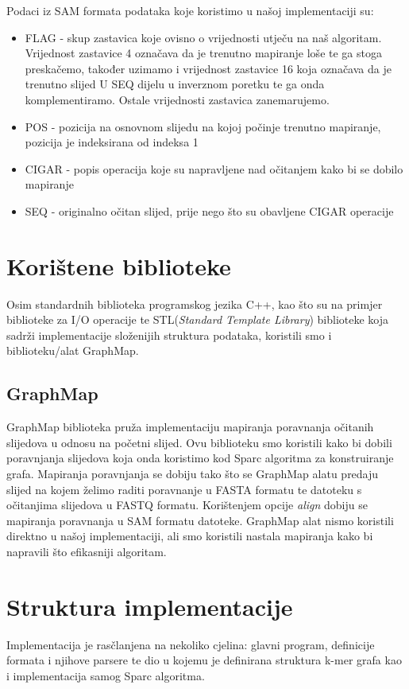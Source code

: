 \documentclass[times, utf8, seminar, numeric]{fer}
\begin{document}
Podaci iz SAM formata podataka koje koristimo u našoj implementaciji su:
\renewcommand{\labelitemi}{$\bullet$}
\begin{itemize}
	\item FLAG - skup zastavica koje ovisno o vrijednosti utječu na naš algoritam. Vrijednost zastavice 4 označava da je trenutno mapiranje loše te ga stoga preskačemo, također uzimamo i vrijednost zastavice 16 koja označava da je trenutno slijed U SEQ dijelu u inverznom poretku te ga onda komplementiramo. Ostale vrijednosti zastavica zanemarujemo.  
	\item POS - pozicija na osnovnom slijedu na kojoj počinje trenutno mapiranje, pozicija je indeksirana od indeksa 1
	\item CIGAR - popis operacija koje su napravljene nad očitanjem kako bi se dobilo mapiranje
	\item SEQ - originalno očitan slijed, prije nego što su obavljene CIGAR operacije
\end{itemize}

\section{Korištene biblioteke}
Osim standardnih biblioteka programskog jezika C++, kao što su na primjer biblioteke za I/O operacije te STL(\emph{Standard Template Library}) biblioteke koja sadrži implementacije složenijih struktura podataka, koristili smo i biblioteku/alat GraphMap.
\subsection{GraphMap}
GraphMap biblioteka pruža implementaciju mapiranja poravnanja očitanih slijedova u odnosu na početni slijed. Ovu biblioteku smo koristili kako bi dobili poravnjanja slijedova koja onda koristimo kod Sparc algoritma za konstruiranje grafa. Mapiranja poravnjanja se dobiju tako što se GraphMap alatu predaju slijed na kojem želimo raditi poravnanje u FASTA formatu te datoteku s očitanjima slijedova u FASTQ formatu. Korištenjem opcije \emph{align} dobiju se mapiranja poravnanja u SAM formatu datoteke.
GraphMap alat nismo koristili direktno u našoj implementaciji, ali smo koristili nastala mapiranja kako bi napravili što efikasniji algoritam.

\section{Struktura implementacije}
Implementacija je rasčlanjena na nekoliko cjelina: glavni program, definicije formata i njihove parsere te dio u kojemu je definirana struktura k-mer grafa kao i implementacija samog Sparc algoritma.
\end{document}
